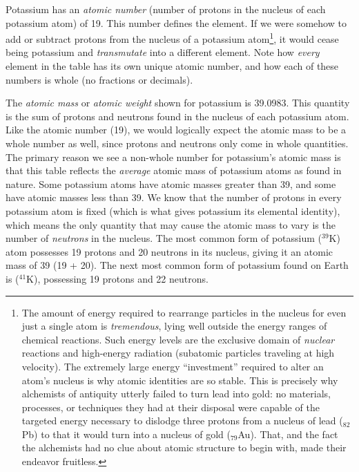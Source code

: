 Potassium has an \textit{atomic number} (number of protons in the nucleus of each potassium atom) of 19.  This number defines the element.  If we were somehow to add or subtract protons from the nucleus of a potassium atom\footnote{The amount of energy required to rearrange particles in the nucleus for even just a single atom is \textit{tremendous}, lying well outside the energy ranges of chemical reactions.  Such energy levels are the exclusive domain of \textit{nuclear} reactions and high-energy radiation (subatomic particles traveling at high velocity).  The extremely large energy ``investment'' required to alter an atom's nucleus is why atomic identities are so stable.  This is precisely why alchemists of antiquity utterly failed to turn lead into gold: no materials, processes, or techniques they had at their disposal were capable of the targeted energy necessary to dislodge three protons from a nucleus of lead ($_{82}$Pb) to that it would turn into a nucleus of gold ($_{79}$Au).  That, and the fact the alchemists had no clue about atomic structure to begin with, made their endeavor fruitless.}, it would cease being potassium and \textit{transmutate} into a different element.  Note how \textit{every} element in the table has its own unique atomic number, and how each of these numbers is whole (no fractions or decimals).  

The \textit{atomic mass} or \textit{atomic weight} shown for potassium is 39.0983.  This quantity is the sum of protons and neutrons found in the nucleus of each potassium atom.  Like the atomic number (19), we would logically expect the atomic mass to be a whole number as well, since protons and neutrons only come in whole quantities.  The primary reason we see a non-whole number for potassium's atomic mass is that this table reflects the \textit{average} atomic mass of potassium atoms as found in nature.  Some potassium atoms have atomic masses greater than 39, and some have atomic masses less than 39.  We know that the number of protons in every potassium atom is fixed (which is what gives potassium its elemental identity), which means the only quantity that may cause the atomic mass to vary is the number of \textit{neutrons} in the nucleus.  The most common form of potassium ($^{39}$K) atom possesses 19 protons and 20 neutrons in its nucleus, giving it an atomic mass of 39 (19 + 20).  The next most common form of potassium found on Earth is ($^{41}$K), possessing 19 protons and 22 neutrons.      

